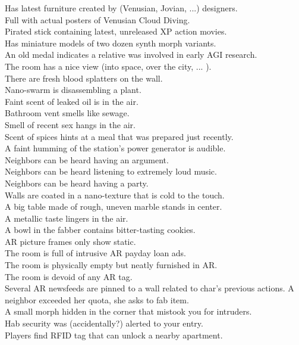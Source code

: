 \documentclass[a4]{article}
\begin{document}
\starttableone
Has latest furniture created by (Venusian, Jovian, ...) designers.\\
Full with actual posters of Venusian Cloud Diving.\\
Pirated stick containing latest, unreleased XP action movies.\\
Has miniature models of two dozen synth morph variants.\\
An old medal indicates a relative was involved in early AGI research.\\
The room has a nice view (into space, over the city, ... ).\\
There are fresh blood splatters on the wall.\\
Nano-swarm is disassembling a plant.\\
Faint scent of leaked oil is in the air.\\
Bathroom vent smells like sewage.\\
Smell of recent sex hangs in the air.\\
Scent of spices hints at a meal that was prepared just recently.\\
A faint humming of the station's power generator is audible.\\
Neighbors can be heard having an argument.\\
Neighbors can be heard listening to extremely loud music.\\
Neighbors can be heard having a party.\\
Walls are coated in a nano-texture that is cold to the touch.\\
A big table made of rough, uneven marble stands in center.\\
A metallic taste lingers in the air.\\
A bowl in the fabber contains bitter-tasting cookies.\\
AR picture frames only show static.\\
The room is full of intrusive AR payday loan ads.\\
The room is physically empty but neatly furnished in AR.\\
The room is devoid of any AR tag.\\
Several AR newsfeeds are pinned to a wall related to char's previous actions.
A neighbor exceeded her quota, she asks to fab item.\\
A small  morph hidden in the corner that mistook you for intruders.\\
Hab security was (accidentally?) alerted to your entry.\\
Players find RFID tag that can unlock a nearby apartment.\\
\stoptableone
\end{document}
